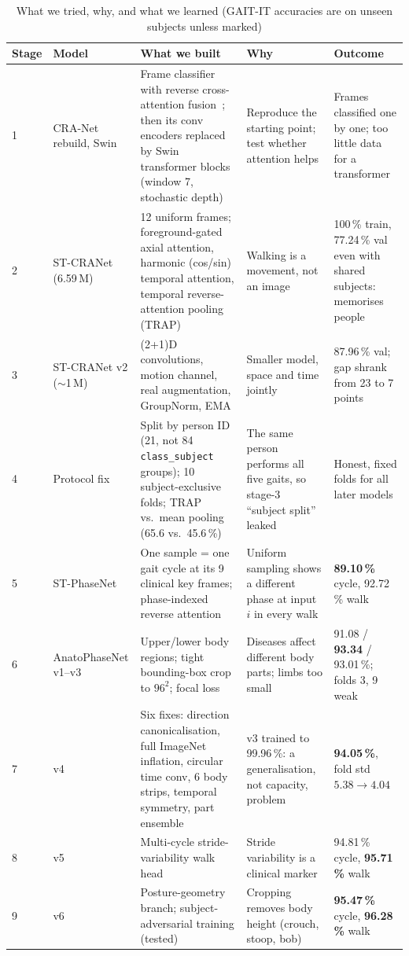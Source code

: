 \documentclass[conference]{IEEEtran}
\begin{document}
\begin{table}[!t]
\centering
\caption{What we tried, why, and what we learned (GAIT-IT accuracies are on unseen subjects unless marked)}
\label{tab:journey}
\footnotesize
\setlength{\tabcolsep}{3pt}
\begin{tabular}{@{}p{0.6cm}p{2.5cm}p{6.2cm}p{4.1cm}p{3.5cm}@{}}
\toprule
Stage & Model & What we built & Why & Outcome \\
\midrule
1 & CRA-Net rebuild, Swin & Frame classifier with reverse cross-attention fusion~\cite{bodepu_cranet}; then its conv encoders replaced by Swin transformer blocks~\cite{liu2021swin} (window 7, stochastic depth) & Reproduce the starting point; test whether attention helps & Frames classified one by one; too little data for a transformer \\
2 & ST-CRANet (6.59\,M) & 12 uniform frames; foreground-gated axial attention, harmonic (cos/sin) temporal attention, temporal reverse-attention pooling (TRAP) & Walking is a movement, not an image & 100\,\% train, 77.24\,\% val even with shared subjects: memorises people \\
3 & ST-CRANet v2 ($\sim$1\,M) & (2+1)D convolutions, motion channel, real augmentation, GroupNorm, EMA & Smaller model, space and time jointly & 87.96\,\% val; gap shrank from 23 to 7 points \\
4 & Protocol fix & Split by person ID (21, not 84 \texttt{class\_subject} groups); 10 subject-exclusive folds; TRAP vs.\ mean pooling (65.6 vs.\ 45.6\,\%) & The same person performs all five gaits, so stage-3 ``subject split'' leaked & Honest, fixed folds for all later models \\
5 & ST-PhaseNet & One sample = one gait cycle at its 9 clinical key frames; phase-indexed reverse attention & Uniform sampling shows a different phase at input $i$ in every walk & \textbf{89.10\,\%} cycle, 92.72\,\% walk \\
6 & AnatoPhaseNet v1--v3 & Upper/lower body regions; tight bounding-box crop to $96^2$; focal loss & Diseases affect different body parts; limbs too small & 91.08 / \textbf{93.34} / 93.01\,\%; folds 3, 9 weak \\
7 & v4 & Six fixes: direction canonicalisation, full ImageNet inflation, circular time conv, 6 body strips, temporal symmetry, part ensemble & v3 trained to 99.96\,\%: a generalisation, not capacity, problem & \textbf{94.05\,\%}, fold std $5.38\rightarrow4.04$ \\
8 & v5 & Multi-cycle stride-variability walk head & Stride variability is a clinical marker & 94.81\,\% cycle, \textbf{95.71\,\%} walk \\
9 & v6 & Posture-geometry branch; subject-adversarial training (tested) & Cropping removes body height (crouch, stoop, bob) & \textbf{95.47\,\%} cycle, \textbf{96.28\,\%} walk \\
\bottomrule
\end{tabular}
\end{table}
\end{document}
